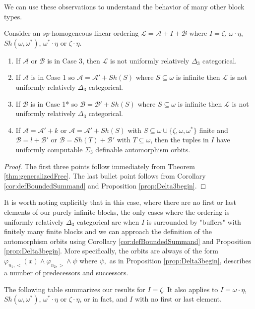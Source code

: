 \documentclass[11pt]{amsart}
\theoremstyle{definition}
\def\A{\mathcal A}
\def\B{\mathcal{B}}
\def\L{\mathcal L}
\begin{document}
We can use these observations to understand the behavior of many other block types.

\begin{corollary}
    Consider an $sp$-homogeneous linear ordering $\L=\A+I+\B$ where  $I=\zeta$, $\omega\cdot\eta$, $Sh(\omega,\omega^*)$, $\omega^*\cdot\eta$ or $\zeta\cdot\eta$.
    \begin{enumerate}
        \item If $\A$ or $\B$ is in Case 3, then $\L$ is not uniformly relatively $\Delta_3$ categorical.
        \item If $\A$ is in Case 1 so $\A=\A'+Sh(S)$ where $S\subseteq\omega$ is infinite then $\L$ is not uniformly relatively $\Delta_3$ categorical.
        \item If $\B$ is in Case 1* so $\B=\B'+Sh(S)$ where $S\subseteq\omega$ is infinite then $\L$ is not uniformly relatively $\Delta_3$ categorical.
        \item If $\A=\A'+k$ or $\A=\A'+Sh(S)$ with $S\subseteq\omega\cup\{\zeta,\omega,\omega^*\}$ finite and $\B=l+\B'$ or $\B=Sh(T)+\B'$ with $T\subseteq\omega$, then the tuples in $I$ have uniformly computable $\Sigma_3$ definable automorphism orbits.
    \end{enumerate}   
    
\end{corollary}

\begin{proof}
    The first three points follow immediately from Theorem \ref{thm:generalizedFree}.
    The last bullet point follows from Corollary \ref{cor:defBoundedSummand} and Proposition \ref{prop:Delta3begin}.
\end{proof}

It is worth noting explicitly that in this case, where there are no first or last elements of our purely infinite blocks, the only cases where the ordering is uniformly relatively $\Delta_3$ categorical are when $I$ is surrounded by "buffers" with finitely many finite blocks and we can approach the definition of the automorphism orbits using Corollary \ref{cor:defBoundedSummand} and Proposition \ref{prop:Delta3begin}.
More specifically, the orbits are always of the form $\varphi_{n_1,<}(x)\land \varphi_{n_2,>}\land \psi$ where $\psi,$ as in Proposition \ref{prop:Delta3begin}, describes a number of predecessors and successors.

The following table summarizes our results for $I=\zeta$.
It also applies to $I=\omega\cdot\eta$, $Sh(\omega,\omega^*)$, $\omega^*\cdot\eta$ or $\zeta\cdot\eta$, or in fact, and $I$ with no first or last element.
\end{document}
